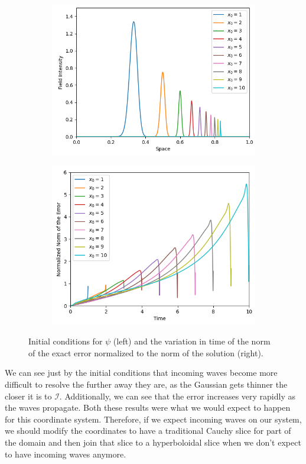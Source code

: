 \begin{figure}[h]
    \centering
    \begin{subfigure}[b]{0.45\textwidth}
        \centering
        \includegraphics[width=\textwidth]{Images/Incoming_IC.png}
    \end{subfigure}
    \hfill
    \begin{subfigure}[b]{0.43\textwidth}
        \centering
        \includegraphics[width=\textwidth]{Images/Incoming_Error.png}
    \end{subfigure}
    \caption{Initial conditions for $\psi$ (left) and the variation in time of the norm of the exact error normalized to the norm of the solution (right).}
    \label{fig:Incoming_Waves}
\end{figure}

We can see just by the initial conditions that incoming waves become more difficult to resolve the further away they are, as the Gaussian gets thinner the closer it is to $\mathscr{I}$. Additionally, we can see that the error increases very rapidly as the waves propagate. Both these results were what we would expect to happen for this coordinate system. Therefore, if we expect incoming waves on our system, we should modify the coordinates to have a traditional Cauchy slice for part of the domain and then join that slice to a hyperboloidal slice when we don't expect to have incoming waves anymore.